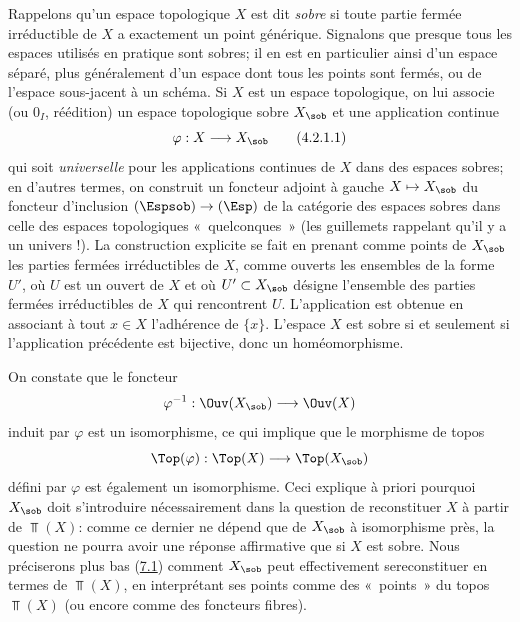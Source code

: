 \documentclass[10pt]{../fichiers-configuration-latex/smfart}
\begin{document}
\subsubsection{}
Rappelons qu'un espace topologique $X$ est dit \emph{sobre} si toute
partie fermée irréductible de $X$ a exactement un point
générique. Signalons que presque tous les espaces utilisés en
pratique sont sobres; il en est en particulier ainsi d'un espace
séparé, plus généralement d'un espace dont tous les points
sont fermés, ou de l'espace sous-jacent à un schéma. Si $X$
est un espace topologique, on lui associe (\loccit ou \EGA
$0_I$, réédition) un espace topologique sobre $X_{\sob}$
et une application continue\pageoriginale
\begin{equation*}
\varphi: X\longrightarrow X_{\sob}\tag{4.2.1.1}
\end{equation*}
qui soit \emph{universelle} pour les applications continues de $X$
dans des espaces sobres; en d'autres termes, on construit un
foncteur adjoint à gauche $X\mapsto X_{\sob}$ du foncteur
d'inclusion $(\Espsob)\rightarrow (\Esp)$ de la catégorie des
espaces sobres dans celle des espaces topologiques
« quelconques » (les guillemets rappelant qu'il y a un univers !). La
construction explicite se fait en prenant comme points de $X_{\sob}$
les parties fermées irréductibles de $X$, comme ouverts les
ensembles de la forme $U'$, où $U$ est un ouvert de $X$ et où
$U'\subset X_{\sob}$ désigne l'ensemble des parties fermées
irréductibles de $X$ qui rencontrent $U$. L'application
 est obtenue en associant à tout $x\in X$
l'adhérence de $\{x\}$. L'espace $X$ est sobre si et seulement si
l'application précédente est bijective, donc un
homéomorphisme.

On constate que le foncteur
$$
\varphi^{-1}:\Ouv(X_{\sob})\longrightarrow \Ouv(X)
$$
induit par $\varphi$ est un isomorphisme, ce qui implique que le
morphisme de topos
$$
\Top(\varphi):\Top(X)\longrightarrow \Top(X_{\sob})
$$
défini par $\varphi$ est également un isomorphisme. Ceci explique à
priori pourquoi $X_{\sob}$ doit s'introduire nécessairement dans la
question de reconstituer $X$ à partir de $\Top(X)$: comme ce dernier
ne dépend que de $X_{\sob}$ à isomorphisme près, la question ne
pourra avoir une réponse affirmative que si $X$ est sobre. Nous
préciserons plus bas (\hyperref[IV.subsec7.1]{7.1}) comment $X_{\sob}$ peut
effectivement se\pageoriginale reconstituer en termes de $\Top(X)$,
en interprétant ses points comme des « points »  du topos
$\Top(X)$ (ou encore comme des foncteurs fibres).
\end{document}
